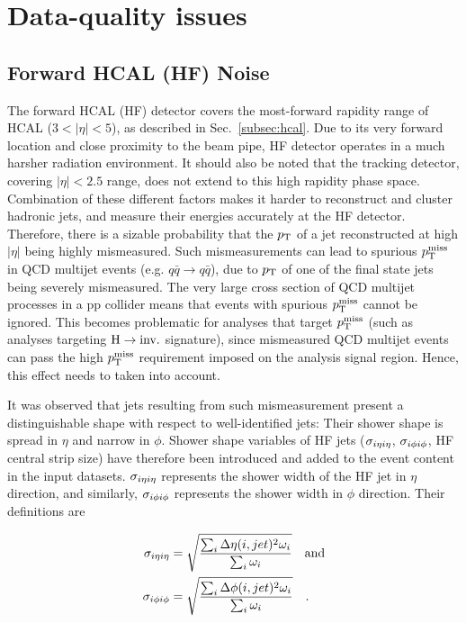 \section{Data-quality issues}
\label{sec:dataquality}

\subsection{Forward HCAL (HF) Noise}
\label{subsec:hfnoise}

The forward HCAL (HF) detector covers the most-forward rapidity range of HCAL ($3 < |\eta| < 5$), as described in
Sec.~\ref{subsec:hcal}. Due to its very forward location and close proximity to the beam pipe, 
HF detector operates in a much harsher radiation environment. 
It should also be noted that the tracking detector, covering $|\eta| < 2.5$ range, does not extend to this high rapidity
phase space. Combination of these different factors makes it harder to reconstruct and cluster hadronic jets, 
and measure their energies accurately at the HF detector. Therefore, there
is a sizable probability that the $p_{\textrm{T}}$ of a jet reconstructed at high $|\eta|$ being highly mismeasured.
Such mismeasurements can lead to spurious $p_{\textrm{T}}^{\textrm{miss}}$ in QCD multijet events (e.g. $q\bar{q} \rightarrow q\bar{q}$),
due to $p_{\textrm{T}}$ of one of the final state jets being severely mismeasured. 
The very large cross section of QCD multijet processes in a pp collider
means that events with spurious $p_{\textrm{T}}^{\textrm{miss}}$ cannot be ignored.
This becomes problematic for analyses that target $p_{\textrm{T}}^{\textrm{miss}}$ (such as analyses targeting $\textrm{H} \rightarrow \textrm{inv.}$ signature), 
since mismeasured QCD multijet events can pass
the high $p_{\textrm{T}}^{\textrm{miss}}$ requirement imposed on the analysis signal region. Hence, this effect needs to taken into account. 

It was observed that jets resulting from such mismeasurement present a distinguishable shape with respect to well-identified jets: 
Their shower shape is spread in $\eta$ and narrow in $\phi$. Shower shape variables of HF jets ($\sigma_{i\eta i\eta}$, $\sigma_{i\phi i\phi}$, HF central strip size) 
have therefore been introduced and added to the event content in the input datasets. 
$\sigma_{i\eta i\eta}$ represents the shower width of the HF jet in $\eta$ direction, and similarly, $\sigma_{i\phi i\phi}$ represents the shower width in $\phi$ direction. 
Their definitions are

\begin{equation}
    \begin{split}
        \sigma_{i\eta i\eta} &= \sqrt{\frac{ \sum_{i} \Delta\eta(i, jet)^2 \omega_i }{ \sum_{i} \omega_i }} \quad \textrm{and} \\
        \sigma_{i\phi i\phi} &= \sqrt{\frac{ \sum_{i} \Delta\phi(i, jet)^2 \omega_i }{ \sum_{i} \omega_i }} \quad .
    \end{split}
    \label{eq:sieie_sipip}
\end{equation}

